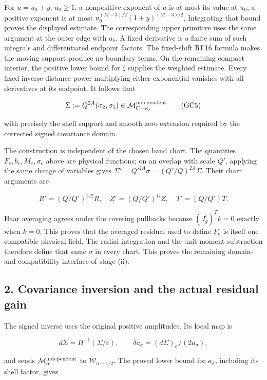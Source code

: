 \documentclass[10pt,a4paper]{article}
\begin{document}
For \(u=u_0+y\), \(u_0\ge1\), a nonpositive exponent of \(u\) is at most its value at \(u_0\); a positive exponent is at most \(u_0^{(M-3)/2}(1+y)^{(M-3)/2}\). Integrating that bound proves the displayed estimate. The corresponding upper primitive uses the same argument at the outer edge with \(a_b\). A fixed derivative is a finite sum of such integrals and differentiated endpoint factors. The fixed-shift RF16 formula makes the moving support produce no boundary terms. On the remaining compact interior, the positive lower bound for \(\zeta\) supplies the weighted estimate. Every fixed inverse-distance power multiplying either exponential vanishes with all derivatives at its endpoint. It follows that

\[
\Sigma:=Q^{2A}(\sigma_2,\sigma_1)
\in\mathcal M_{C-\kappa_s}^{\rm independent}
\tag{GC5}
\]

with precisely the shell support and smooth zero extension required by the corrected signed covariance domain.

The construction is independent of the chosen band chart. The quantities \(F_e,b_e,M_e,\sigma_e\) above are physical functions; on an overlap with scale \(Q'\), applying the same change of variables gives \(\Sigma'=Q'^{2A}\sigma=(Q'/Q)^{2A}\Sigma\). Their chart arguments are

\[
R'=(Q/Q')^{1/2}R,\quad Z'=(Q/Q')^DZ,
\quad T'=(Q/Q')T.
\]

Haar averaging agrees under the covering pullbacks because \((J_g^i)^Tk=0\) exactly when \(k=0\). This proves that the averaged residual used to define \(F_e\) is itself one compatible physical field. The radial integration and the unit-moment subtraction therefore define that same \(\sigma\) in every chart. This proves the remaining domain-and-compatibility interface of stage (ii).

\subsection{2. Covariance inversion and the actual residual gain}\label{gclosure:covariance-inversion-and-the-actual-residual-gain}

The signed inverse uses the original positive amplitudes. Its local map is

\[
d\Sigma=H^{-1}(\Sigma/\varepsilon),\qquad
\delta a_\sigma=(d\Sigma)_\sigma/(2a_\sigma),
\]

and sends \(\mathcal M_\alpha^{\rm independent}\) to \(\mathcal W_{\alpha-1/2}\). The proved lower bound for \(a_\sigma\), including its shell factor, gives
\end{document}
